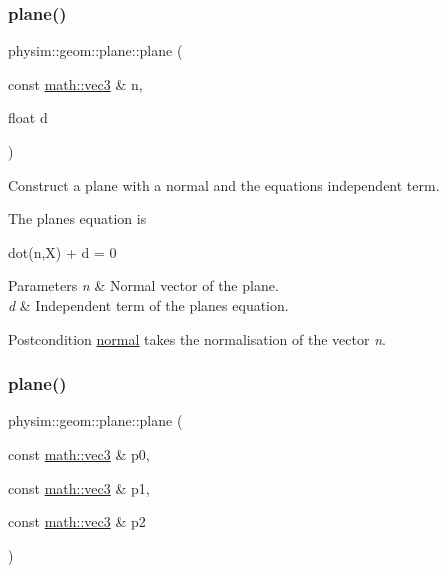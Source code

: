 \subsubsection{\texorpdfstring{plane()}{plane()}\hspace{0.1cm}{\footnotesize\ttfamily [2/3]}}
{\footnotesize\ttfamily physim\+::geom\+::plane\+::plane (\begin{DoxyParamCaption}\item[{const \hyperlink{structphysim_1_1math_1_1vec3}{math\+::vec3} \&}]{n,  }\item[{float}]{d }\end{DoxyParamCaption})}



Construct a plane with a normal and the equation\textquotesingle{}s independent term. 

The plane\textquotesingle{}s equation is \begin{DoxyVerb}dot(n,X) + d = 0
\end{DoxyVerb}
 
\begin{DoxyParams}{Parameters}
{\em n} & Normal vector of the plane. \\
\hline
{\em d} & Independent term of the plane\textquotesingle{}s equation. \\
\hline
\end{DoxyParams}
\begin{DoxyPostcond}{Postcondition}
\hyperlink{classphysim_1_1geom_1_1plane_ab9502f59c7c72083fe4ab166ad8e637a}{normal} takes the normalisation of the vector {\itshape n}. 
\end{DoxyPostcond}
\mbox{\label{classphysim_1_1geom_1_1plane_a2dd759ec4519cfd2fb943bda36988f9a}} 
\subsubsection{\texorpdfstring{plane()}{plane()}\hspace{0.1cm}{\footnotesize\ttfamily [3/3]}}
{\footnotesize\ttfamily physim\+::geom\+::plane\+::plane (\begin{DoxyParamCaption}\item[{const \hyperlink{structphysim_1_1math_1_1vec3}{math\+::vec3} \&}]{p0,  }\item[{const \hyperlink{structphysim_1_1math_1_1vec3}{math\+::vec3} \&}]{p1,  }\item[{const \hyperlink{structphysim_1_1math_1_1vec3}{math\+::vec3} \&}]{p2 }\end{DoxyParamCaption})}



